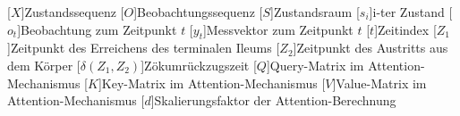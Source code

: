 \begin{acronym}[SPARQL]
[$X$]{Zustandssequenz}
[$O$]{Beobachtungssequenz}
[$S$]{Zustandsraum}
[$s_i$]{i-ter Zustand}
[$o_t$]{Beobachtung zum Zeitpunkt $t$}
[$y_t$]{Messvektor zum Zeitpunkt $t$}
[$t$]{Zeitindex}
[$Z_1$]{Zeitpunkt des Erreichens des terminalen Ileums}
[$Z_2$]{Zeitpunkt des Austritts aus dem Körper}
[$\delta(Z_1, Z_2)$]{Zökumrückzugszeit}
[$Q$]{Query-Matrix im Attention-Mechanismus}
[$K$]{Key-Matrix im Attention-Mechanismus}
[$V$]{Value-Matrix im Attention-Mechanismus}
[$d$]{Skalierungsfaktor der Attention-Berechnung}

\end{acronym}
